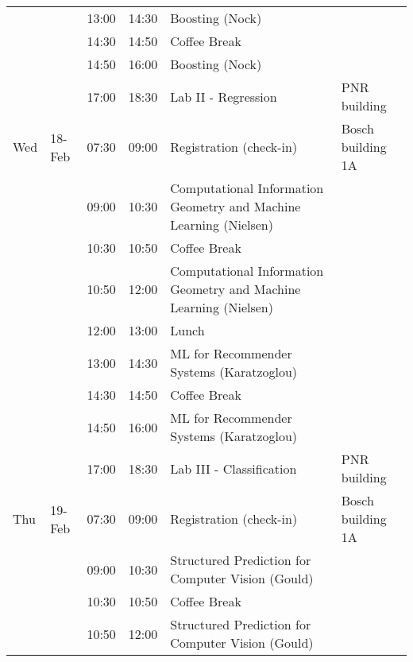 \begin{table}[h]
\begin{tabular}{  l l l l p{7cm} l    }
    &        & 13:00 & 14:30 & Boosting (Nock)                                                   &                   \\
    &        & 14:30 & 14:50 & Coffee Break                                                      &                   \\
    &        & 14:50 & 16:00 & Boosting (Nock)                                                   &                   \\
    &        & 17:00 & 18:30 & Lab II - Regression                                               & PNR building      \\
Wed & 18-Feb & 07:30 & 09:00 & Registration (check-in)                                           & Bosch building 1A \\
    &        & 09:00 & 10:30 & Computational Information Geometry and Machine Learning (Nielsen) &                   \\
    &        & 10:30 & 10:50 & Coffee Break                                                      &                   \\
    &        & 10:50 & 12:00 & Computational Information Geometry and Machine Learning (Nielsen) &                   \\
    &        & 12:00 & 13:00 & Lunch                                                             &                   \\
    &        & 13:00 & 14:30 & ML for Recommender Systems (Karatzoglou)                          &                   \\
    &        & 14:30 & 14:50 & Coffee Break                                                      &                   \\
    &        & 14:50 & 16:00 & ML for Recommender Systems (Karatzoglou)                          &                   \\
    &        & 17:00 & 18:30 & Lab III - Classification                                          & PNR building      \\
Thu & 19-Feb & 07:30 & 09:00 & Registration (check-in)                                           & Bosch building 1A \\
    &        & 09:00 & 10:30 & Structured Prediction for Computer Vision (Gould)                 &                   \\
    &        & 10:30 & 10:50 & Coffee Break                                                      &                   \\
    &        & 10:50 & 12:00 & Structured Prediction for Computer Vision (Gould)                 &                   \\

\end{tabular}
\end{table}
